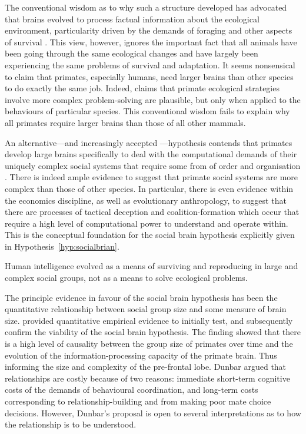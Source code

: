 The conventional wisdom as to why such a structure developed has advocated that brains evolved to process factual information about the ecological environment, particularity driven by the demands of foraging and other aspects of survival \citep{BrockHarvey1980}. This view, however, ignores the important fact that all animals have been going through the same ecological changes and have largely been experiencing the same problems of survival and adaptation. It seems nonsensical to claim that primates, especially humans, need larger brains than other species to do exactly the same job. Indeed, claims that primate ecological strategies involve more complex problem-solving are plausible, but only when applied to the behaviours of particular species. This conventional wisdom fails to explain why all primates require larger brains than those of all other mammals.

An alternative---and increasingly accepted \citep{Dunbar2009}---hypothesis contends that primates develop large brains specifically to deal with the computational demands of their uniquely complex social systems that require some from of order and organisation \citep{WhitenByrne1988}. There is indeed ample evidence to suggest that primate social systems are more complex than those of other species. In particular, there is even evidence within the economics discipline, as well as evolutionary anthropology, to suggest that there are processes of tactical deception and coalition-formation which occur that require a high level of computational power to understand and operate within. This is the conceptual foundation for the social brain hypothesis explicitly given in Hypothesis~\ref{hyp:socialbrian}.

\begin{hypothesis} \label{hyp:socialbrian}
Human intelligence evolved as a means of surviving and reproducing in large and complex social groups, not as a means to solve ecological problems.
\end{hypothesis}

The principle evidence in favour of the social brain hypothesis has been the quantitative relationship between social group size and some measure of brain size. \citet{Dunbar1998} provided quantitative empirical evidence to initially test, and subsequently confirm the viability of the social brain hypothesis. The finding showed that there is a high level of causality between the group size of primates over time and the evolution of the information-processing capacity of the primate brain. Thus informing the size and complexity of the pre-frontal lobe. Dunbar argued that relationships are costly because of two reasons: immediate short-term cognitive costs of the demands of behavioural coordination, and long-term costs corresponding to relationship-building and from making poor mate choice decisions. However, Dunbar's proposal is open to several interpretations as to how the relationship is to be understood.

